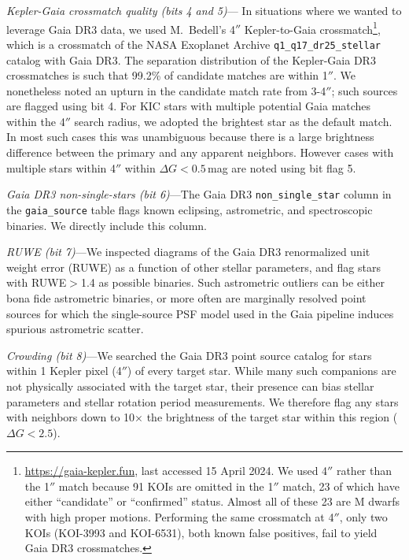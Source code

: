 \documentclass[11pt,twocolumn,tighten]{aastex63}
\begin{document}
{\it Kepler-Gaia crossmatch quality (bits 4 and 5)}--- In situations
where we wanted to leverage Gaia DR3 data, we used M.~Bedell's 4$''$
Kepler-to-Gaia crossmatch\footnote{\url{https://gaia-kepler.fun}, last
accessed 15 April 2024.  We used 4$''$ rather than the 1$''$ match
because 91 KOIs are omitted in the 1$''$ match, 23 of which have
either ``candidate'' or ``confirmed'' status.  Almost all of these 23
are M dwarfs with high proper motions.  Performing the same crossmatch
at 4$''$, only two KOIs (KOI-3993 and KOI-6531), both known
false positives, fail to yield Gaia DR3 crossmatches.}, which is a
crossmatch of the NASA Exoplanet Archive
\texttt{q1\_q17\_dr25\_stellar} catalog with Gaia DR3.  The separation
distribution of the Kepler-Gaia DR3 crossmatches is such that 99.2\%
of candidate matches are within 1$''$.   We nonetheless noted an
upturn in the candidate match rate from 3-4$''$; such sources are
flagged using bit 4.  For KIC stars with multiple potential Gaia
matches within the 4$''$ search radius, we adopted the brightest star
as the default match.  In most such cases this was unambiguous because
there is a large brightness difference between the primary and any
apparent neighbors.  However cases with multiple stars within 4$''$
within $\Delta G$$<$$0.5$\,mag are noted using bit flag 5.  

{\it Gaia DR3 non-single-stars (bit 6)}---The Gaia DR3
\texttt{non\_single\_star} column in the \texttt{gaia\_source} table
flags known eclipsing, astrometric, and spectroscopic binaries.  We
directly include this column.

{\it RUWE (bit 7)}---We inspected diagrams of the Gaia DR3 renormalized
unit weight error
(RUWE) as a function of other stellar parameters, %
and flag stars with RUWE$>$1.4 as possible binaries.  Such astrometric
outliers can be either bona fide astrometric binaries, or more often
are marginally resolved point sources for which the single-source PSF
model used in the Gaia pipeline induces spurious astrometric scatter.

{\it Crowding (bit 8)}---We searched the Gaia DR3 point source catalog
for stars within 1 Kepler pixel (4$''$) of every target star.  While
many such companions are not physically associated with the target
star, their presence can bias stellar parameters and stellar rotation
period measurements.  We therefore flag any stars with neighbors down
to 10$\times$ the brightness of the target star within this region
($\Delta G < 2.5$).
\end{document}
